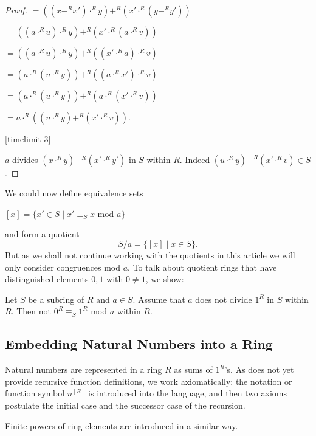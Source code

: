 \documentclass[11pt]{article}
\begin{document}
\begin{forthel}
\begin{proof}
$ = ((x -^{R} x') \cdot^{R} y) +^{R} (x' \cdot^{R} (y -^{R} y'))$

$ = ((a \cdot^{R} u) \cdot^{R} y) +^{R} (x' \cdot^{R} (a \cdot^{R} v))$

$ = ((a \cdot^{R} u) \cdot^{R} y) +^{R} ((x' \cdot^{R} a) \cdot^{R} v)$

$ = (a \cdot^{R} (u \cdot^{R} y)) +^{R} ((a \cdot^{R} x') \cdot^{R} v)$

$ = (a \cdot^{R} (u \cdot^{R} y)) +^{R} (a \cdot^{R} (x' \cdot^{R} v))$

$ = a \cdot^{R} ((u \cdot^{R} y) +^{R} (x' \cdot^{R} v))$.

[timelimit 3]

$a$ divides $(x \cdot^{R} y) -^{R} (x' \cdot^{R} y')$
in $S$ within $R$. Indeed
$(u \cdot^{R} y) +^{R} (x' \cdot^{R} v) \in S$.
\end{proof}

\end{forthel}
We could now define equivalence sets 

$[x]=\{x' \in S \mid x' \equiv_{S} x $ mod $a\}$

\noindent and form a quotient
\[S/a = \{[x]\mid x \in S\}.\]
But as we shall not continue working with the quotients in this article
we will only consider congruences mod $a$. To talk about 
quotient rings that have distinguished elements $0,1$ with 
$0 \neq 1$, we show:
\begin{forthel}
\begin{lemma}
Let $S$ be a subring of $R$ and $a \in S$.
Assume that $a$ does not divide $1^{R}$ in $S$ within $R$.
Then not $0^{R} \equiv_{S} 1^{R}$ mod $a$ within $R$.
\end{lemma}


\end{forthel}

\subsection{Embedding Natural Numbers into a Ring}

Natural numbers are represented in a ring $R$ as sums of $1^{R}$'s.
As \Naproche does not yet provide recursive function definitions,
we work axiomatically: the notation or function symbol $n^{[R]}$ is
introduced into the language, and then two axioms postulate the initial case
and the successor case of the recursion.

Finite powers of ring elements are introduced in a similar way.
\end{document}
